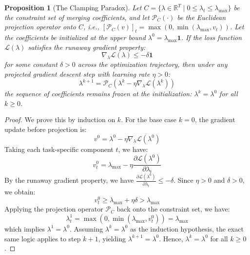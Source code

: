 \documentclass{article}
\theoremstyle{plain}
\newtheorem{proposition}[theorem]{Proposition}
\theoremstyle{definition}
\theoremstyle{remark}
\begin{document}
\begin{proposition}[The Clamping Paradox]
  Let $C = \{ \lambda \in \mathbb{R}^T \mid 0 \le \lambda_t \le \lambda_{\text{max}} \}$ be the constraint set of merging coefficients, and let $\mathcal{P}_C(\cdot)$ be the Euclidean projection operator onto $C$, i.e., $\left[\mathcal{P}_C(v)\right]_t = \max(0, \min(\lambda_{\text{max}}, v_t))$. Let the coefficients be initialized at the upper bound $\lambda^0 = \lambda_{\text{max}} \mathbf{1}$. If the loss function $\mathcal{L}(\lambda)$ satisfies the runaway gradient property:
  \begin{equation}
    \nabla_{\lambda} \mathcal{L}(\lambda) \le -\delta \mathbf{1}
  \end{equation}
  for some constant $\delta > 0$ across the optimization trajectory, then under any projected gradient descent step with learning rate $\eta > 0$:
  \begin{equation}
    \lambda^{k+1} = \mathcal{P}_C \left( \lambda^k - \eta \nabla_{\lambda} \mathcal{L}(\lambda^k) \right)
  \end{equation}
  the sequence of coefficients remains frozen at the initialization: $\lambda^k = \lambda^0$ for all $k \ge 0$.
\end{proposition}

\begin{proof}
  We prove this by induction on $k$. For the base case $k = 0$, the gradient update before projection is:
  \begin{equation}
    v^0 = \lambda^0 - \eta \nabla_{\lambda} \mathcal{L}(\lambda^0)
  \end{equation}
  Taking each task-specific component $t$, we have:
  \begin{equation}
    v^0_t = \lambda_{\text{max}} - \eta \frac{\partial \mathcal{L}(\lambda^0)}{\partial \lambda_t}
  \end{equation}
  By the runaway gradient property, we have $\frac{\partial \mathcal{L}(\lambda^0)}{\partial \lambda_t} \le -\delta$. Since $\eta > 0$ and $\delta > 0$, we obtain:
  \begin{equation}
    v^0_t \ge \lambda_{\text{max}} + \eta \delta > \lambda_{\text{max}}
  \end{equation}
  Applying the projection operator $\mathcal{P}_C$ back onto the constraint set, we have:
  \begin{equation}
    \lambda^1_t = \max\left(0, \min\left(\lambda_{\text{max}}, v^0_t\right)\right) = \lambda_{\text{max}}
  \end{equation}
  which implies $\lambda^1 = \lambda^0$. Assuming $\lambda^k = \lambda^0$ as the induction hypothesis, the exact same logic applies to step $k+1$, yielding $\lambda^{k+1} = \lambda^0$. Hence, $\lambda^k = \lambda^0$ for all $k \ge 0$.
\end{proof}
\end{document}
